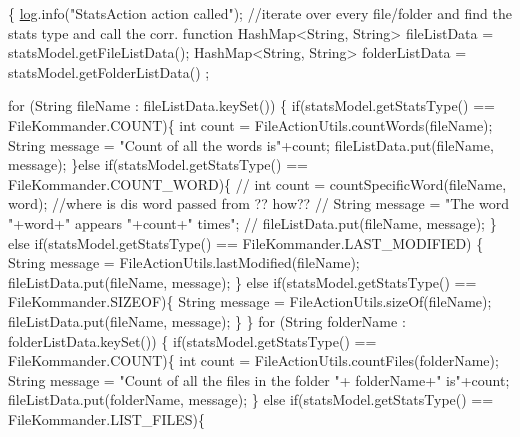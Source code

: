 \begin{DoxyCode}
                                                                        \{
        \hyperlink{classcom_1_1poly_1_1nlp_1_1filekommander_1_1file_1_1actions_1_1_call_action_a65b722d9482bd93c3ae2b31f51050a08}{log}.info(\textcolor{stringliteral}{"StatsAction action called"}); 
        \textcolor{comment}{//iterate over every file/folder and find the stats type and call the
       corr. function }
        HashMap<String, String> fileListData = statsModel.getFileListData();
        HashMap<String, String> folderListData = statsModel.getFolderListData()
      ;

        \textcolor{keywordflow}{for} (String fileName : fileListData.keySet()) \{
            \textcolor{keywordflow}{if}(statsModel.getStatsType() == FileKommander.COUNT)\{
                \textcolor{keywordtype}{int} count = FileActionUtils.countWords(fileName);
                String message = \textcolor{stringliteral}{"Count of all the words is"}+count;
                fileListData.put(fileName, message);
            \}\textcolor{keywordflow}{else} \textcolor{keywordflow}{if}(statsModel.getStatsType() == FileKommander.COUNT\_WORD)\{
        \textcolor{comment}{//      int count = countSpecificWord(fileName, word); //where is dis
       word passed from ?? how??}
        \textcolor{comment}{//      String message = "The word "+word+" appears "+count+" times";}
        \textcolor{comment}{//      fileListData.put(fileName, message);}
            \} \textcolor{keywordflow}{else} \textcolor{keywordflow}{if}(statsModel.getStatsType() == FileKommander.LAST\_MODIFIED)
      \{
                String message = FileActionUtils.lastModified(fileName);
                fileListData.put(fileName, message);
            \} \textcolor{keywordflow}{else} \textcolor{keywordflow}{if}(statsModel.getStatsType() == FileKommander.SIZEOF)\{
                String message = FileActionUtils.sizeOf(fileName);
                fileListData.put(fileName, message);
            \}
        \}
        \textcolor{keywordflow}{for} (String folderName : folderListData.keySet()) \{
            \textcolor{keywordflow}{if}(statsModel.getStatsType() == FileKommander.COUNT)\{
                \textcolor{keywordtype}{int} count = FileActionUtils.countFiles(folderName);
                String message = \textcolor{stringliteral}{"Count of all the files in the folder "}+
      folderName+\textcolor{stringliteral}{" is"}+count;
                fileListData.put(folderName, message);
            \} \textcolor{keywordflow}{else} \textcolor{keywordflow}{if}(statsModel.getStatsType() == FileKommander.LIST\_FILES)\{

\end{DoxyCode}
